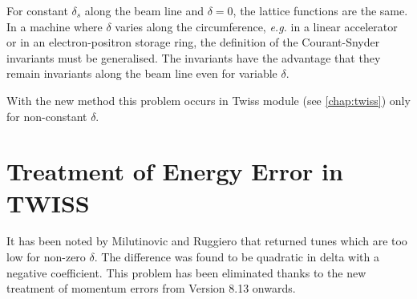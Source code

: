 For constant $\delta_s$ along the beam line and $\delta = 0$, the
lattice functions are the same. In a machine where $\delta$ varies along
the circumference, \textsl{e.g.} in a linear accelerator or in an
electron-positron storage ring, the definition of the Courant-Snyder
invariants must be generalised. The \madeight invariants have the advantage
that they remain invariants along the beam line even for variable $\delta$.

With the new method this problem occurs in Twiss module (see
\ref{chap:twiss}) only for non-constant $\delta$.    

\section{Treatment of Energy Error in TWISS} 
\label{sec:twiss-energy-error}
It has been noted by Milutinovic and Ruggiero \cite{milutinovic1988}
that \madeight returned tunes which are too low for non-zero
$\delta$. The difference was found to be quadratic in delta with a negative
coefficient. This problem has been eliminated thanks to the new
treatment  of momentum errors from \madeight Version 8.13 onwards.


